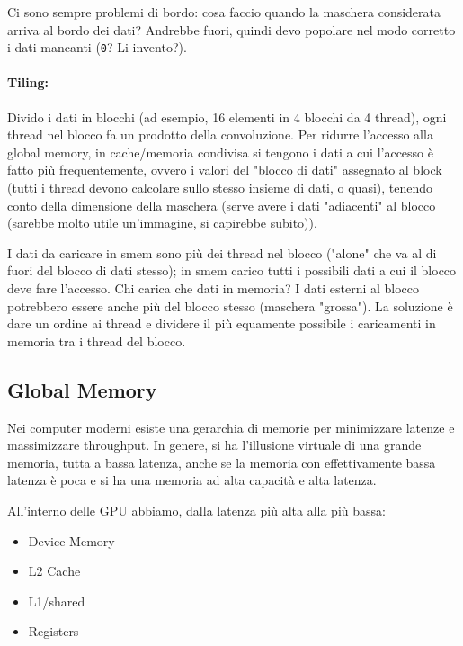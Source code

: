 Ci sono sempre problemi di bordo: cosa faccio quando la maschera considerata arriva al bordo dei dati? Andrebbe fuori, quindi devo popolare nel modo corretto i dati mancanti (\texttt{0}? Li invento?).

\paragraph{Tiling:} Divido i dati in blocchi (ad esempio, 16 elementi in 4 blocchi da 4 thread), ogni thread nel blocco fa un prodotto della convoluzione. Per ridurre l'accesso alla global memory, in cache/memoria condivisa si tengono i dati a cui l'accesso è fatto più frequentemente, ovvero i valori del "blocco di dati" assegnato al block (tutti i thread devono calcolare sullo stesso insieme di dati, o quasi), tenendo conto della dimensione della maschera (serve avere i dati "adiacenti" al blocco (sarebbe molto utile un'immagine, si capirebbe subito)).

I dati da caricare in smem sono più dei thread nel blocco ("alone" che va al di fuori del blocco di dati stesso); in smem carico tutti i possibili dati a cui il blocco deve fare l'accesso. Chi carica che dati in memoria? I dati esterni al blocco potrebbero essere anche più del blocco stesso (maschera "grossa"). La soluzione è dare un ordine ai thread e dividere il più equamente possibile i caricamenti in memoria tra i thread del blocco.

\newpage

\subsection{Global Memory}

Nei computer moderni esiste una gerarchia di memorie per minimizzare latenze e massimizzare throughput. In genere, si ha l'illusione virtuale di una grande memoria, tutta a bassa latenza, anche se la memoria con effettivamente bassa latenza è poca e si ha una memoria ad alta capacità e alta latenza.

All'interno delle GPU abbiamo, dalla latenza più alta alla più bassa: 
\begin{itemize}
	\item Device Memory
	
	\item L2 Cache
	
	\item L1/shared
	
	\item Registers
\end{itemize}

